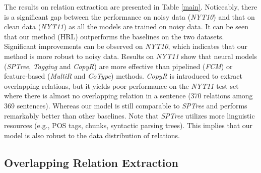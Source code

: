 \documentclass[letterpaper]{article} %
\theoremstyle{definition}
\begin{document}
The results on relation extraction are presented in Table \ref{main}. Noticeably, there is a significant gap between the performance on noisy data (\textit{NYT10}) and that on clean data (\textit{NYT11}) as all the models are trained on noisy data. It can be seen that our method (HRL) outperforms the baselines on the two datasets. Significant improvements can be observed on \textit{NYT10}, which indicates that our method is more robust to noisy data.
Results on \textit{NYT11} show that neural models (\textit{SPTree}, \textit{Tagging} and \textit{CopyR}) are more effective than pipelined (\textit{FCM}) or feature-based (\textit{MultiR} and \textit{CoType}) methods.
\textit{CopyR} is introduced to extract overlapping relations, but it yields poor performance on the \textit{NYT11} test set where there is almost no overlapping relation in a sentence (370 relations among 369 sentences). Whereas our model is still comparable to \textit{SPTree} and performs remarkably better than other baselines. Note that \textit{SPTree} utilizes more linguistic resources (e.g., POS tags, chunks, syntactic parsing trees). This implies that our model is also robust to the data distribution of relations.

\subsection{Overlapping Relation Extraction}

\end{document}
